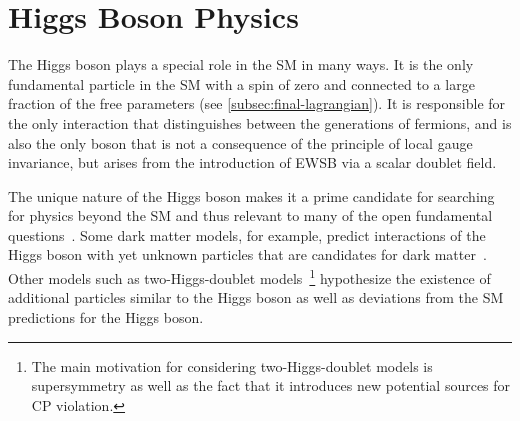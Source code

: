 \chapter{Higgs Boson Physics}
\label{chap:higgs}


The Higgs boson plays a special role in the SM in many ways.
It is the only fundamental particle in the SM with a spin of zero and connected to a large fraction of the free parameters (see \cref{subsec:final-lagrangian}). 
It is responsible for the only interaction that distinguishes between the generations of fermions, and is also the only boson that is not a consequence of the principle of local gauge invariance, but arises from the introduction of EWSB via a scalar doublet field. 

The unique nature of the Higgs boson makes it a prime candidate for searching for physics beyond the SM and thus relevant to many of the open fundamental questions~\cite{2019BHeinemann}. 
Some dark matter models, for example, predict interactions of the Higgs boson with yet unknown particles that are candidates for dark matter~\cite{Baumgart_2009,Kaplan_2009,Dienes_2012}. 
Other models such as two-Higgs-doublet models~\cite{Branco_2012}\footnote{The main motivation for considering two-Higgs-doublet models is supersymmetry as well as the fact that it introduces new potential sources for CP violation.} hypothesize the existence of additional particles similar to the Higgs boson as well as deviations from the SM predictions for the Higgs boson.

